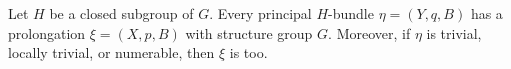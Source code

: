 Let $H$ be a closed subgroup of $G$. Every principal $H$-bundle $\eta = (Y, q, B)$ has a prolongation $\xi = (X, p, B)$ with structure group $G$. Moreover, if $\eta$ is trivial, locally trivial, or numerable, then $\xi$ is too.
